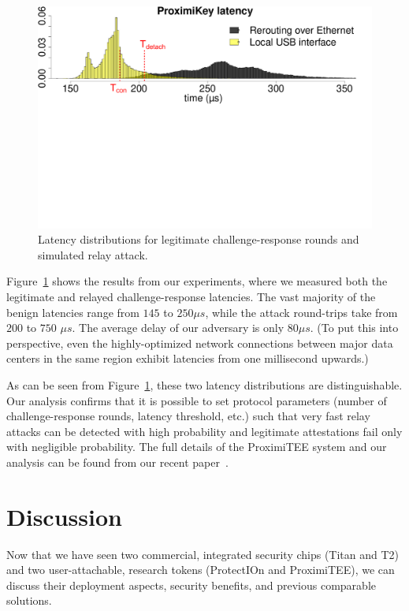 \documentclass[letterpaper,twocolumn,10pt]{article}
\newcommand{\protection}{\textsf{ProtectIOn}\xspace}
\newcommand{\proximitee}{\textsf{ProximiTEE}\xspace}
\begin{document}
\begin{figure}[t]
  \centering
    \includegraphics[trim={0 13.4cm 0 0},
    clip,width=\linewidth]{histo.pdf} 
    \caption{Latency distributions for legitimate challenge-response rounds and simulated relay attack.}
    \label{graph:histogram}
\end{figure}

Figure~\ref{graph:histogram} shows the results from our experiments, where we measured both the legitimate and relayed challenge-response latencies. The vast majority of the benign latencies range from $145$ to $250 \mu s$, while the attack round-trips take from $200$ to $750$ $\mu s$. The average delay of our adversary is only $80 \mu s$. (To put this into perspective, even the highly-optimized network connections between major data centers in the same region exhibit latencies from one millisecond upwards.) 

As can be seen from Figure~\ref{graph:histogram}, these two latency distributions are distinguishable. Our analysis confirms that it is possible to set protocol parameters (number of challenge-response rounds, latency threshold, etc.) such that very fast relay attacks can be detected with high probability and legitimate attestations fail only with negligible probability. The full details of the \proximitee system and our analysis can be found from our recent paper~\cite{proximitee}.


\section*{Discussion}

Now that we have seen two commercial, integrated security chips (Titan and T2) and two user-attachable, research tokens (\protection and \proximitee), we can discuss their deployment aspects, security benefits, and previous comparable solutions. 
\end{document}
